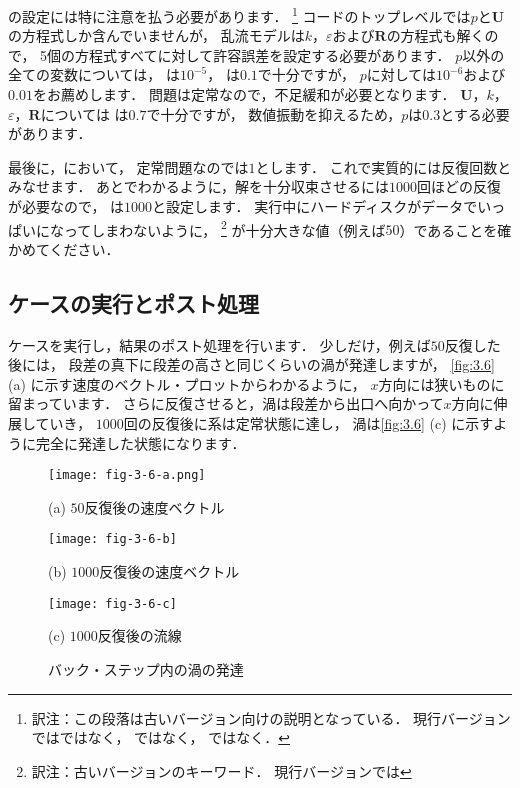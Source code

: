 の設定には特に注意を払う必要があります．%
\footnote{訳注：この段落は古いバージョン向けの説明となっている．
現行バージョンではではなく，
ではなく，
ではなく．}%
コードのトップレベルでは$p$と$\bm{U}$の方程式しか含んでいませんが，
乱流モデルは$k$，$\varepsilon$および$\bm{R}$の方程式も解くので，
5個の方程式すべてに対して許容誤差を設定する必要があります．
$p$以外の全ての変数については，
は$10^{-5}$，
は$0.1$で十分ですが，
$p$に対しては$10^{-6}$および$0.01$をお薦めします．
問題は定常なので，不足緩和が必要となります．
$\bm{U}$，$k$，$\varepsilon$，$\bm{R}$については
は$0.7$で十分ですが，
数値振動を抑えるため，$p$は$0.3$とする必要があります．

最後に，において，
定常問題なのでは$1$とします．
これで実質的には反復回数とみなせます．
あとでわかるように，解を十分収束させるには$1000$回ほどの反復が必要なので，
は$1000$と設定します．
実行中にハードディスクがデータでいっぱいになってしまわないように，
%
\footnote{訳注：古いバージョンのキーワード．
現行バージョンでは}%
が十分大きな値（例えば$50$）であることを確かめてください．


\subsection{ケースの実行とポスト処理}
\label{ssec:3.2.5}
ケースを実行し，結果のポスト処理を行います．
少しだけ，例えば$50$反復した後には，
段差の真下に段差の高さと同じくらいの渦が発達しますが，
\autoref{fig:3.6} (a) に示す速度のベクトル・プロットからわかるように，
$x$方向には狭いものに留まっています．
さらに反復させると，渦は段差から出口へ向かって$x$方向に伸展していき，
$1000$回の反復後に系は定常状態に達し，
渦は\autoref{fig:3.6} (c) に示すように完全に発達した状態になります．


\begin{figure}[ht]
 \texttt{[image: fig-3-6-a.png]}\par
 \medskip
 (a) $50$反復後の速度ベクトル\par
 \bigskip
 \texttt{[image: fig-3-6-b]}\par
 \medskip
 (b) $1000$反復後の速度ベクトル\par
 \bigskip
 \texttt{[image: fig-3-6-c]}\par
 \medskip
 (c) $1000$反復後の流線\par
 \medskip
 \caption{バック・ステップ内の渦の発達}
 \label{fig:3.6}
\end{figure}




